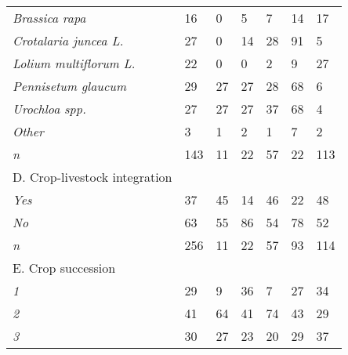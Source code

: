 \documentclass[
  12pt,
  a4paper]{article}
\begin{document}
\begin{table}[ht!]
\begin{tabular}{@{}lllllll@{}}
\hspace{3mm}\textit{Brassica rapa}            & 16     & 0     & 5         & 7       & 14        & 17    \\
\hspace{3mm}\textit{Crotalaria juncea L.}                & 27     & 0     & 14        & 28      & 91        & 5     \\
\hspace{3mm}\textit{Lolium multiflorum L.}         & 22     & 0     & 0         & 2       & 9         & 27    \\
\hspace{3mm}\textit{Pennisetum glaucum}             & 29     & 27    & 27        & 28      & 68        & 6     \\
\hspace{3mm}\textit{Urochloa spp.}               & 27     & 27    & 27        & 37      & 68        & 4     \\
\hspace{3mm}\textit{Other}                    & 3      & 1     & 2         & 1       & 7         & 2     \\
\hspace{3mm}\textit{n}                        & 143    & 11    & 22        & 57      & 22        & 113   \\
D. Crop-livestock integration     &        &       &           &         &           &       \\
\hspace{3mm}\textit{Yes}                      & 37     & 45    & 14        & 46      & 22        & 48    \\
\hspace{3mm}\textit{No}                       & 63     & 55    & 86        & 54      & 78        & 52    \\
\hspace{3mm}\textit{n}                        & 256    & 11    & 22        & 57      & 93        & 114   \\ 
E. Crop succession                &        &       &           &         &           &       \\
\hspace{3mm}\textit{1}                        & 29     & 9     & 36        & 7       & 27        & 34    \\
\hspace{3mm}\textit{2}                        & 41     & 64    & 41        & 74      & 43        & 29    \\
\hspace{3mm}\textit{3}                        & 30     & 27    & 23        & 20      & 29        & 37    \\

\end{tabular}
\end{table}
\end{document}
